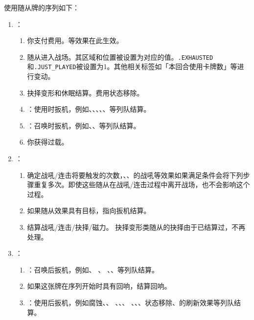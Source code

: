 使用随从牌的序列如下：
\begin{enumerate}
    \item {}：
    \begin{enumerate}
        \item 你支付费用。等效果在此生效。
        \item 随从进入战场。其区域和位置被设置为对应的值。\texttt{.EXHAUSTED}和\texttt{.JUST\_\allowbreak{}PLAYED}被设置为1。其他相关标签如「本回合使用卡牌数」等进行变动。
        \item 抉择变形和休眠结算。费用状态移除。
        \item {}：使用时扳机，例如、、、、、等列队结算。
        \item {}：召唤时扳机，例如、、等列队结算。
        \item 你获得过载。
    \end{enumerate}

    \item {}：
    \begin{enumerate}
        \item 确定战吼/连击将要触发的次数，、、的战吼等效果如果满足条件会将下列步骤重复多次。即使这些随从在战吼/连击过程中离开战场，也不会影响这个过程。
        \item 如果随从效果具有目标，指向扳机结算。
        \item 结算战吼/连击/抉择/磁力。
            \exception 抉择变形类随从的抉择由于已结算过，不再处理。
    \end{enumerate}

    \item {}：
    \begin{enumerate}
        \item {}：召唤后扳机，例如、 、 、、等列队结算。
        \item 如果这张牌在序列开始时具有回响，结算回响。
        \item {}：使用后扳机，例如腐蚀、、 、、、 、、、状态移除、的刷新效果等列队结算。
    \end{enumerate}

\end{enumerate}

